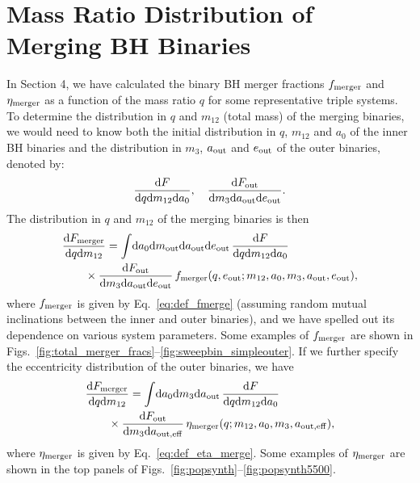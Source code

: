 \documentclass[
        fleqn,
        usenatbib,
    ]{mnras}
\newcommand*{\md}[0]{\mathrm{d}}
\begin{document}
\section{Mass Ratio Distribution of Merging BH Binaries}\label{s:q_dist}

In Section 4, we have calculated the binary BH merger fractions $f_{\rm merger}$
and $\eta_{\rm merger}$ as a function of the mass ratio $q$ for some
representative triple systems. To determine the distribution in $q$ and $m_{12}$
(total mass) of the merging binaries, we would need to know both the
initial distribution in $q$, $m_{12}$ and $a_0$ of the inner BH binaries and the
distribution in $m_3$, $a_{\rm out}$ and $e_{\rm out}$ of the outer
binaries, denoted by:
\begin{align}
    \frac{\md F}{ \md q \md m_{12} \md a_0},\quad
    \frac{\md F_{\rm out}}{ \md m_3 \md a_{\rm out} \md e_{\rm out}}.
\end{align}
The distribution in $q$ and $m_{12}$ of the merging binaries is then
\begin{align}
    & {\md F_{\rm merger}\over \md q \md m_{12}} = \int \!\md a_0 \md m_{\rm
        out}\md a_{\rm out}\md e_{\rm out}\, {\md F\over \md q \md m_{12} \md
        a_0}\nonumber\\
    &\qquad \times {\md F_{\rm out}\over \md m_3 \md a_{\rm out} \md  e_{\rm out}}\,
      f_{\rm merger}(q,e_{\rm out}; m_{12},a_0,m_3,a_{\rm out},e_{\rm out}),
      \label{eq:dong1}
\end{align}
where $f_{\rm merger}$ is given by Eq.~\eqref{eq:def_fmerge} (assuming random
mutual inclinations between the inner and outer binaries), and we have spelled
out its dependence on various system parameters. Some examples of $f_{\rm
merger}$ are shown in
Figs.~\ref{fig:total_merger_fracs}--\ref{fig:sweepbin_simpleouter}. If we
further specify the eccentricity distribution of the outer binaries, we have
\begin{align}
    & {\md F_{\rm merger}\over \md q \md m_{12}} = \int
        \!\md a_0 \md m_3\md a_{\rm out}\,
        {\md F\over \md q \md m_{12} \md a_0}\nonumber\\
    &\qquad \times {\md F_{\rm out}\over \md m_3 \md a_{\rm out,eff}}\,
        \eta_{\rm merger}(q; m_{12},a_0,m_3,a_{\rm out,eff}),
        \label{eq:dong2}
\end{align}
where $\eta_{\rm merger}$ is given by Eq.~\eqref{eq:def_eta_merge}. Some
examples of $\eta_{\rm merger}$ are shown in the top panels of
Figs.~\ref{fig:popsynth}--\ref{fig:popsynth5500}.
\end{document}

